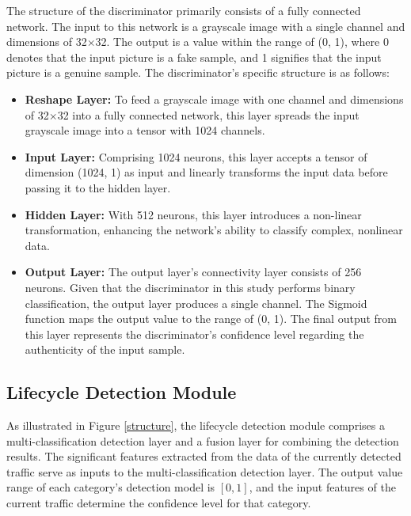 \documentclass[journal]{IEEEtai}
\begin{document}
The structure of the discriminator primarily consists of a fully connected network. 
The input to this network is a grayscale image with a single channel and dimensions of 32$\times$32. 
The output is a value within the range of (0, 1), where 0 denotes that the input picture is a fake sample, and 1 signifies that the input picture is a genuine sample. 
The discriminator's specific structure is as follows:

\begin{itemize}
    \item \textbf{Reshape Layer:} To feed a grayscale image with one channel and dimensions of 32$\times$32 into a fully connected network, this layer spreads the input grayscale image into a tensor with 1024 channels.

    \item \textbf{Input Layer:} Comprising 1024 neurons, this layer accepts a tensor of dimension (1024, 1) as input and linearly transforms the input data before passing it to the hidden layer.

    \item \textbf{Hidden Layer:} With 512 neurons, this layer introduces a non-linear transformation, enhancing the network's ability to classify complex, nonlinear data.

    \item \textbf{Output Layer:} The output layer's connectivity layer consists of 256 neurons. 
    Given that the discriminator in this study performs binary classification, the output layer produces a single channel. The Sigmoid function maps the output value to the range of (0, 1). 
    The final output from this layer represents the discriminator's confidence level regarding the authenticity of the input sample.
\end{itemize}





\subsection{Lifecycle Detection Module}
\label{Lifecycle Detection Module}

As illustrated in Figure \ref{structure}, the lifecycle detection module comprises a multi-classification detection layer and a fusion layer for combining the detection results. 
The significant features extracted from the data of the currently detected traffic serve as inputs to the multi-classification detection layer. 
The output value range of each category's detection model is $[0, 1]$, and the input features of the current traffic determine the confidence level for that category.
\end{document}
